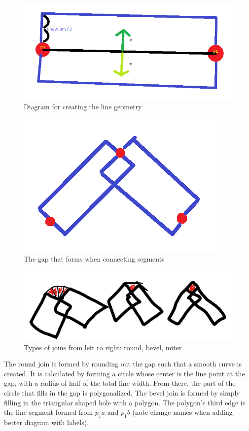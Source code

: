 \documentclass[12pt]{report}
\begin{document}
\begin{figure}
	\includegraphics[width=\textwidth]{linesegment1.png}
	\caption{Diagram for creating the line geometry}
\end{figure}

\begin{figure}
	\includegraphics[width=\textwidth]{linesegment2.png}
	\caption{The gap that forms when connecting segments}
\end{figure}

\begin{figure}
	\includegraphics[width=\textwidth]{jointypes.jpg}
	\caption{Types of joins from left to right: round, bevel, miter}
\end{figure}
The round join is formed by rounding out the gap such that a smooth curve is created. 
It is calculated by forming a circle whose center is the line point at the gap, with a radius of half of the total line width. 
From there, the part of the circle that fills in the gap is polygonalized.
The bevel join is formed by simply filling in the triangular shaped hole with a polygon. 
The polygon's third edge is the line segment formed from $p_1a$ and $p_1b$ (note change names when adding better diagram with labels).
\end{document}
